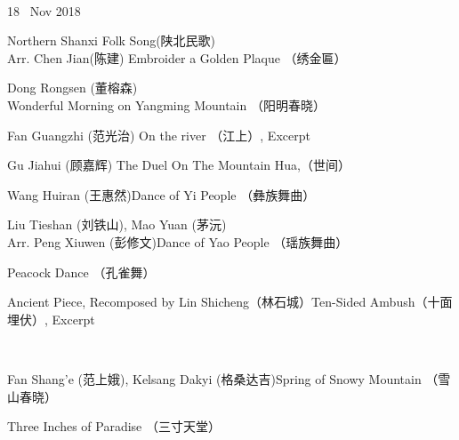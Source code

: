 \documentclass[letter,6pt,poets]{ConcProg}
\begin{document}
\begin{spacing}{1.0}
\begin{programme}{
\\  {\normalsize 18 ~Nov 2018}
}
\begin{part}[]
    \begin{composition}{Northern Shanxi Folk Song(陕北民歌)\\Arr. Chen Jian(陈建)} {}{Embroider a Golden Plaque  （绣金匾）}{}
    \end{composition}
    \begin{composition}{Dong Rongsen (董榕森)} {}{Wonderful Morning on Yangming Mountain  （阳明春晓）
}{}
    \end{composition}
    \begin{composition}{Fan Guangzhi (范光治)} {}{On the river （江上）, Excerpt}{}
                   {}{}
    \end{composition}
     \begin{composition}{Gu Jiahui (顾嘉辉)} {}{The Duel On The Mountain Hua,（世间）}{}
                   {}{}
    \end{composition}    
    \begin{composition}{Wang Huiran (王惠然)}{}{Dance of Yi People  （彝族舞曲）}{}
                   {}{}
    \end{composition}
    \begin{composition}{Liu Tieshan (刘铁山), Mao Yuan (茅沅) \\Arr. Peng Xiuwen (彭修文)}{}{Dance of Yao People  （瑶族舞曲）}{}
    \end{composition}
    \begin{composition}{}{}{Peacock Dance （孔雀舞） }{}
                   {}{}
    \end{composition}
    \begin{composition}{Ancient Piece, Recomposed by Lin Shicheng（林石城）}{}{Ten-Sided Ambush（十面埋伏）, Excerpt}{}
    \end{composition}\\
    \begin{composition}{Fan Shang'e (范上娥), Kelsang Dakyi (格桑达吉)}{}{Spring of Snowy Mountain   （雪山春晓）}{}
                   {}{}
    \end{composition}
    \begin{composition}{}{}{Three Inches of Paradise  （三寸天堂）}{}

\end{composition}
\end{part}
\end{programme}
\end{spacing}
\end{document}
